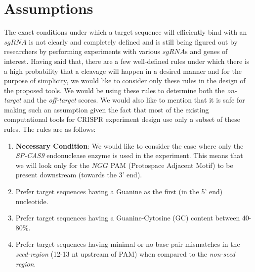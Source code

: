 \documentclass[12pt]{article}
\begin{document}
\section*{Assumptions}
	The exact conditions under which a target sequence will efficiently bind with an $sgRNA$ is not clearly and completely defined and is still being figured out by researchers by performing experiments with various $sgRNA$s and genes of interest. Having said that, there are a few well-defined rules under which there is a high probability that a cleavage will happen in a desired manner and for the purpose of simplicity, we would like to consider only these rules in the design of the proposed tools. We would be using these rules to determine both the \textit{on-target} and the \textit{off-target} scores. We would also like to mention that it is safe for making such an assumption given the fact that most of the existing computational tools for CRISPR experiment design use only a subset of these rules. The rules are as follows:

    \begin{enumerate}
		\item \textbf{Necessary Condition}: We would like to consider the case where only the \textit{SP-CAS9} endonuclease enzyme is used in the experiment. This means that we will look only for the $NGG$ PAM (Protospace Adjacent Motif) to be present downstream (towards the 3' end).
        \item Prefer target sequences having a Guanine as the first (in the 5' end) nucleotide.
        \item Prefer target sequences having a Guanine-Cytosine (GC) content between 40-80\%.
       	\item Prefer target sequences having minimal or no base-pair mismatches in the \textit{seed-region} (12-13 nt upstream of PAM) when compared to the \textit{non-seed region}.
    \end{enumerate}
\end{document}
